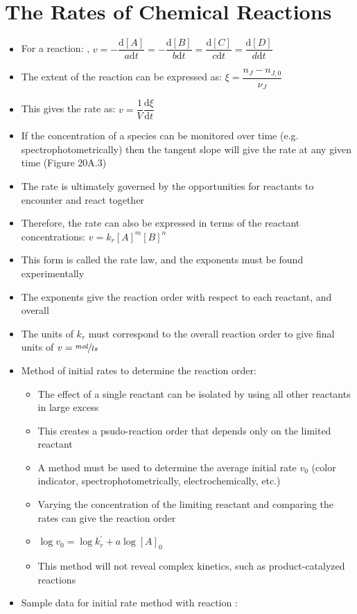 \documentclass[12pt, openany, letterpaper]{memoir}
\begin{document}
\section{The Rates of Chemical Reactions}
\begin{itemize}
	\item For a reaction: , $v=-\dfrac{\mathrm{d}[A]}{a\mathrm{d}t} = -\dfrac{\mathrm{d}[B]}{b\mathrm{d}t} = \dfrac{\mathrm{d}[C]}{c\mathrm{d}t} = \dfrac{\mathrm{d}[D]}{d\mathrm{d}t}$
	\item The extent of the reaction can be expressed as: $\xi=\dfrac{n_J-n_{J,0}}{\nu_J}$
	\item This gives the rate as: $v = \dfrac{1}{V}\dfrac{\mathrm{d}\xi}{\mathrm{d}t}$
	\item If the concentration of a species can be monitored over time (e.g. spectrophotometrically) then the tangent slope will give the rate at any given time (Figure 20A.3)
	\item The rate is ultimately governed by the opportunities for reactants to encounter and react together
	\item Therefore, the rate can also be expressed in terms of the reactant concentrations: $v=k_r[A]^m[B]^n$
	\item This form is called the rate law, and the exponents must be found experimentally
	\item The exponents give the reaction order with respect to each reactant, and overall
	\item The units of $k_r$ must correspond to the overall reaction order to give final units of $v=\nicefrac{mol}{ls}$
	\item Method of initial rates to determine the reaction order:
	\begin{itemize}
		\item The effect of a single reactant can be isolated by using all other reactants in large excess
		\item This creates a psudo-reaction order that depends only on the limited reactant
		\item A method must be used to determine the average initial rate $v_0$ (color indicator, spectrophotometrically, electrochemically, etc.)
		\item Varying the concentration of the limiting reactant and comparing the rates can give the reaction order
		\item $\log v_0 = \log k_r^\prime + a \log [A]_0$
		\item This method will not reveal complex kinetics, such as product-catalyzed reactions
	\end{itemize}
	\item Sample data for initial rate method with reaction :
\end{itemize}
\end{document}
